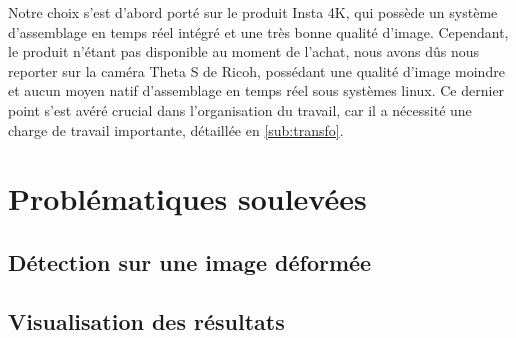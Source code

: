 			Notre choix s'est d'abord porté sur le produit Insta 4K\cite{insta360}, qui possède un système d'assemblage en temps réel intégré et une très bonne qualité d'image. Cependant, le produit n'étant pas disponible au moment de l'achat, nous avons dûs nous reporter sur la caméra Theta S de Ricoh\cite{ricohthetas}, possédant une qualité d'image moindre et aucun moyen natif d'assemblage en temps réel sous systèmes linux. Ce dernier point s'est avéré crucial dans l'organisation du travail, car il a nécessité une charge de travail importante, détaillée en \ref{sub:transfo}.

	\section{Problématiques soulevées}

		\subsection{Détection sur une image déformée}


		\subsection{Visualisation des résultats}

		
			

